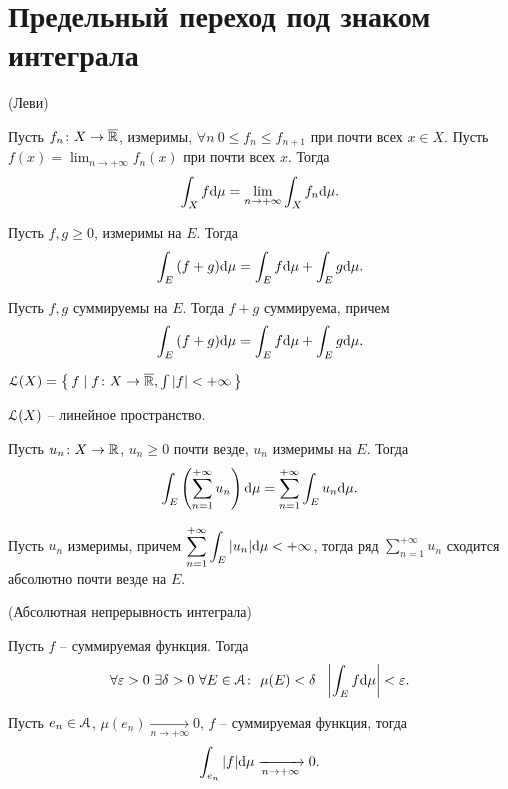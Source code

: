 \section{Предельный переход под знаком интеграла}

\begin{theorem}(Леви)

    Пусть $f_n \colon X \to \overline{\mathbb{R}}$, измеримы, $\forall n~ 0 \leqslant f_n \leqslant f_{n + 1}$
    при почти всех $x \in X$. Пусть $\displaystyle f(x) = \lim_{n \to +\infty}{f_n(x)}$ 
    при почти всех $x$. Тогда
\[
    \int_X{f \mathrm{d}\mu} = \lim_{n \to +\infty}{\int_X{f_n \mathrm{d}\mu}}
.\] 
\end{theorem}

\begin{theorem}

    Пусть $f, g \geqslant 0$, измеримы на $E$. Тогда
\[
    \int_E{(f + g) \mathrm{d}\mu} = \int_E{f \mathrm{d}\mu} + \int_E{g \mathrm{d}\mu}
.\] 
\end{theorem}

\begin{corollary}
    
    Пусть $f, g$ суммируемы на $E$. Тогда $f + g$ суммируема, причем
\[
    \int_E{(f + g) \mathrm{d}\mu} = \int_E{f \mathrm{d}\mu} + \int_E{g \mathrm{d}\mu}
.\]
\end{corollary}

\begin{definition}
    $\mathcal{L}(X) = \left\{\, f \mid f \colon X \to \overline{\mathbb{R}}, \int{|f|} < +\infty \,\right\}$
\end{definition}

\begin{lemma}
    $\mathcal{L}(X)$ -- линейное пространство. 
\end{lemma}

\begin{theorem}
    Пусть $u_n \colon X \to \mathbb{R}$, $u_n \geqslant 0$ почти везде, $u_n$ измеримы на $E$.
    Тогда
\[
    \int_E{\left(\sum_{n = 1}^{+\infty}{u_n}\right) \mathrm{d}\mu} = \sum_{n = 1}^{+\infty}{\int_E{u_n \mathrm{d}\mu}}
.\]
\end{theorem}

\begin{corollary}
    Пусть $u_n$ измеримы, причем $\displaystyle \sum_{n = 1}^{+\infty}{\int_E{|u_n| \mathrm{d}\mu}} < +\infty$,
    тогда ряд $\displaystyle \sum_{n = 1}^{+\infty}{u_n}$ сходится абсолютно почти везде на $E$.
\end{corollary}

\begin{theorem}(Абсолютная непрерывность интеграла)

    Пусть $f$ -- суммируемая функция. Тогда
\[
    \forall \varepsilon > 0~ \exists \delta > 0~ \forall E \in \mathcal{A}\colon~ \mu(E) < \delta
    ~~ \left|\int_E{f \mathrm{d}\mu}\right| < \varepsilon
.\] 
\end{theorem}

\begin{corollary}
    Пусть $e_n \in \mathcal{A}$, $\mu(e_n) \xrightarrow[n \to +\infty]{} 0$, $f$ -- суммируемая функция,
    тогда
\[
    \int_{e_n}{|f| \mathrm{d}\mu} \xrightarrow[n \to +\infty]{} 0
.\] 
\end{corollary}
